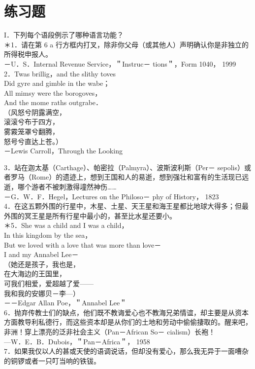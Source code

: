 \section*{练习题}
I．下列每个语段例示了哪种语言功能？\\
＊1．请在第 6 a 行方框内打叉，除非你父母（或其他人）声明确认你是非独立的所得税申报人。\\
－U．S．Internal Revenue Service，＂Instruc－ tions＂，Form 1040， 1999\\
2．Twas brillig，and the slithy toves\\
Did gyre and gimble in the wabe；\\
All mimsy were the borogoves，\\
And the mome raths outgrabe．\\
（风怒兮阴露满空，\\
滚滚兮布于四方，\\
雾霚笼罩兮翻腾，\\
怒号兮直达上苍。）\\
－Lewis Carroll，Through the Looking

3．站在迦太基（Carthage）、帕密拉（Palmyra）、波斯波利斯（Per－ sepolis）或者罗马（Rome）的遗迹上，想到王国和人的易逝，想到强壮和富有的生活现已远逝，哪个游者不被刺激得墥然神伤……\\
－G．W．F．Hegel，Lectures on the Philoso－ phy of History， 1823\\
4．在这五颗外围的行星中，木星、土星、天王星和海王星都比地球大得多；但最外围的冥王星是所有行星中最小的，甚至比水星还要小。\\
＊5．She was a child and I was a child，\\
In this kingdom by the sea，\\
But we loved with a love that was more than love－\\
I and my Annabel Lee－\\
（她还是孩子，我也是，\\
在大海边的王国里，\\
可我们相爱，爱超越了爱——\\
我和我的安娜贝－李—）\\
－－Edgar Allan Poe，＂Annabel Lee＂\\
6．抛弃传教士们的缺点，他们既不教诲爱心也不教海兄弟情谊，却主要是从资本方面教导利私德行，而这些资本却是从你们的土地和劳动中偷偷捿取的。醒来吧，非洲！穿上漂亮的泛非社会主义（Pan－African So－ cialism）长袍！\\
—W．E．B．Dubois，＂Pan－Africa＂， 1958\\
7．如果我仅以人的甚或天使的语调说话，但却没有爱心，那么我无异于一面嘈杂的铜锣或者一只叮当响的铁钹。

